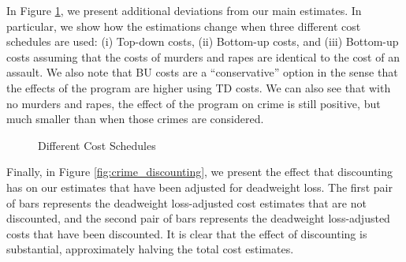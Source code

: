 \noindent In Figure \ref{fig:costs_schedules}, we present additional deviations from our main estimates. In particular, we show how the estimations change when three different cost schedules are used: (i) Top-down costs, (ii) Bottom-up costs, and (iii) Bottom-up costs assuming that the costs of murders and rapes are identical to the cost of an assault. We also note that BU costs are a ``conservative'' option in the sense that the effects of the program are higher using TD costs. We can also see that with no murders and rapes, the effect of the program on crime is still positive, but much smaller than when those crimes are considered. \\

\begin{figure} [H]
\caption{Different Cost Schedules}
\centering  \label{fig:costs_schedules}
{}
\end{figure}

\noindent Finally, in Figure \ref{fig:crime_discounting}, we present the effect that discounting has on our estimates that have been adjusted for deadweight loss. The first pair of bars represents the deadweight loss-adjusted cost estimates that are not discounted, and the second pair of bars represents the deadweight loss-adjusted costs that have been discounted. It is clear that the effect of discounting is substantial, approximately halving the total cost estimates.

